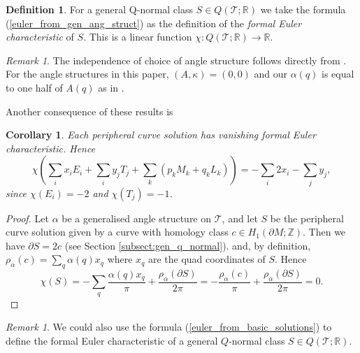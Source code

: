 \documentclass[12pt,reqno]{amsart}  %
\newtheorem{cor}[thm]{Corollary}
\theoremstyle{definition}
\newtheorem{defn}[thm]{Definition}
\theoremstyle{remark}
\newtheorem{rmk}[thm]{Remark}
\def\R{\mathbb{R}}
\def\be{  \begin{equation} }
\def\ee{  \end{equation} }
\newcommand{\T}{\mathcal{T}}
\def\Z{\mathbb Z}
\def\bd{\partial}
\begin{document}
\begin{defn}
\label{formal_euler_from_ang_str}
For a general Q-normal class $S \in Q(\T;\R)$ we take the formula 
(\ref{euler_from_gen_ang_struct}) as the definition of the 
{\em formal Euler characteristic} of $S$. This is a linear function 
$\chi: Q(\T;\R) \to \R$.
\end{defn}

\begin{rmk}
The independence of choice of angle structure follows directly from 
\cite[Lemma 15]{LT}. For the angle structures in this paper, 
$(A,\kappa) =(0,0)$ and our $\alpha(q)$ is equal to one half of $ A(q)$ 
as in \cite{LT}. 
\end{rmk}

Another consequence of these results is 

\begin{cor}
Each peripheral curve solution has vanishing formal Euler characteristic.
Hence 
\be
\label{euler_from_basic_solutions}
\chi\left(\sum_i x_i E_i + \sum_i y_j T_j 
+ \sum_k (p_k M_k  + q_k L_k) \right) = - \sum_i 2 x_i - \sum_j y_j,
\ee
since $\chi(E_i)=-2$ and $\chi(T_j)=-1$.
\end{cor}

\begin{proof} 
Let $\alpha$ be a generalised angle structure on $\T$, and
let $S$ be the  peripheral curve solution given by a curve with homology 
class $c \in H_1(\bd M;\Z)$.
Then we have $\bd S = 2 c$ (see Section \ref{subsect:gen_q_normal}).
and, by definition, $\rho_\alpha(c)= \sum_{q} \alpha(q) x_q$ where $x_q$ are 
the quad coordinates of $S$.
Hence
$$
\chi(S) = - \sum_{q} \frac{\alpha(q) x_q}{\pi} + \frac{ \rho_\alpha(\bd S)}{2\pi} 
= -  \frac{\rho_\alpha(c)}{\pi} + \frac{ \rho_\alpha(\bd S)}{2\pi} =0.
$$
\end{proof}

\begin{rmk}
We could also use  the formula (\ref{euler_from_basic_solutions}) to define 
the formal Euler characteristic of a general $Q$-normal class $S \in Q(\T;\R)$.
\end{rmk}
\end{document}
